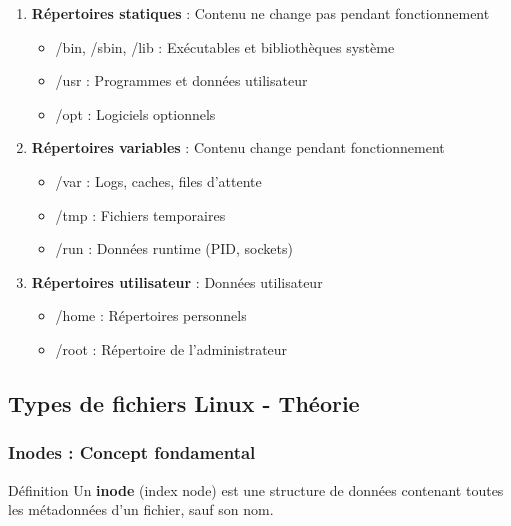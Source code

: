 \documentclass[12pt,a4paper]{article}
\begin{document}
\begin{enumerate}
    \item \textbf{Répertoires statiques} : Contenu ne change pas pendant fonctionnement
    \begin{itemize}
        \item /bin, /sbin, /lib : Exécutables et bibliothèques système
        \item /usr : Programmes et données utilisateur
        \item /opt : Logiciels optionnels
    \end{itemize}
    \item \textbf{Répertoires variables} : Contenu change pendant fonctionnement
    \begin{itemize}
        \item /var : Logs, caches, files d'attente
        \item /tmp : Fichiers temporaires
        \item /run : Données runtime (PID, sockets)
    \end{itemize}
    \item \textbf{Répertoires utilisateur} : Données utilisateur
    \begin{itemize}
        \item /home : Répertoires personnels
        \item /root : Répertoire de l'administrateur
    \end{itemize}
\end{enumerate}

\subsection{Types de fichiers Linux - Théorie}

\subsubsection{Inodes : Concept fondamental}

\begin{infobox}{Définition}
Un \textbf{inode} (index node) est une structure de données contenant toutes les métadonnées d'un fichier, sauf son nom.
\end{infobox}
\end{document}
